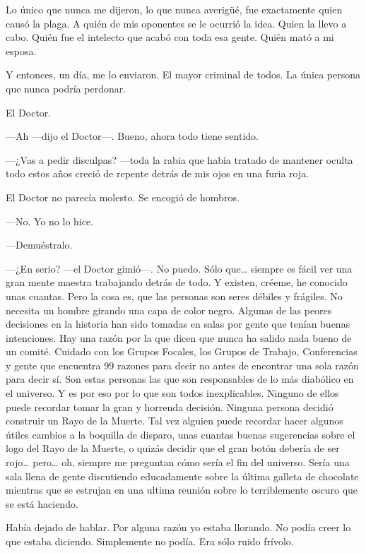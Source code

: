 Lo único que nunca me dijeron, lo que nunca averigüé, fue exactamente
quien causó la plaga. A quién de mis oponentes se le ocurrió la idea.
Quien la llevo a cabo. Quién fue el intelecto que acabó con toda esa
gente. Quién mató a mi esposa.

Y entonces, un día, me lo enviaron. El mayor criminal de todos. La única
persona que nunca podría perdonar.

El Doctor.

---Ah ---dijo el Doctor---. Bueno, ahora todo tiene sentido.

---¿Vas a pedir disculpas? ---toda la rabia que había tratado de
mantener oculta todo estos años creció de repente detrás de mis ojos en
una furia roja.

El Doctor no parecía molesto. Se encogió de hombros.

---No. Yo no lo hice.

---Demuéstralo.

---¿En serio? ---el Doctor gimió---. No puedo. Sólo que\ldots{} siempre
es fácil ver una gran mente maestra trabajando detrás de todo. Y
existen, créeme, he conocido unas cuantas. Pero la cosa es, que las
personas son seres débiles y frágiles. No necesita un hombre girando una
capa de color negro. Algunas de las peores decisiones en la historia han
sido tomadas en salas por gente que tenían buenas intenciones. Hay una
razón por la que dicen que nunca ha salido nada bueno de un comité.
Cuidado con los Grupos Focales, los Grupos de Trabajo, Conferencias y
gente que encuentra 99 razones para decir no antes de encontrar una sola
razón para decir sí. Son estas personas las que son responsables de lo
más diabólico en el universo. Y es por eso por lo que son todos
inexplicables. Ninguno de ellos puede recordar tomar la gran y horrenda
decisión. Ninguna persona decidió construir un Rayo de la Muerte. Tal
vez alguien puede recordar hacer algunos útiles cambios a la boquilla de
disparo, unas cuantas buenas sugerencias sobre el logo del Rayo de la
Muerte, o quizás decidir que el gran botón debería de ser rojo\ldots{}
pero\ldots{} oh, siempre me preguntan cómo sería el fin del universo.
Sería una sala llena de gente discutiendo educadamente sobre la última
galleta de chocolate mientras que se estrujan en una ultima reunión
sobre lo terriblemente oscuro que se está haciendo.

Había dejado de hablar. Por alguna razón yo estaba llorando. No podía
creer lo que estaba diciendo. Simplemente no podía. Era sólo ruido
frívolo.

